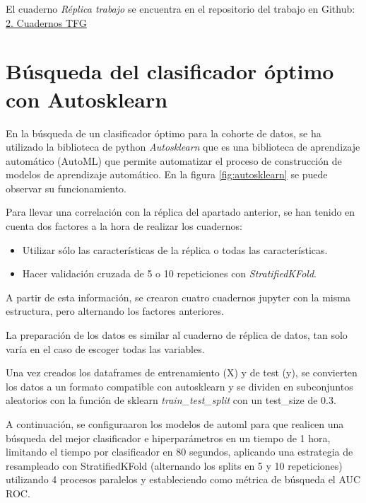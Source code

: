 El cuaderno \textit{Réplica trabajo} se encuentra en el repositorio del trabajo en Github: \href{https://github.com/sgg0008/ml-COVID-19/tree/main/2. Cuadernos TFG}{2. Cuadernos TFG}

\section{Búsqueda del clasificador óptimo con Autosklearn}

En la búsqueda de un clasificador óptimo para la cohorte de datos, se ha utilizado la biblioteca de python \textit{Autosklearn} que es una biblioteca de aprendizaje automático (AutoML) que permite automatizar el proceso de construcción de modelos de aprendizaje automático. En la figura \ref{fig:autosklearn} se puede observar su funcionamiento.


Para llevar una correlación con la réplica del apartado anterior, se han tenido en cuenta dos factores a la hora de realizar los cuadernos:

\begin{itemize}
    \item Utilizar sólo las características de la réplica o todas las características.
    \item Hacer validación cruzada de 5 o 10 repeticiones con \textit{StratifiedKFold}.
\end{itemize}

A partir de esta información, se crearon cuatro cuadernos jupyter con la misma estructura, pero alternando los factores anteriores.

La preparación de los datos es similar al cuaderno de réplica de datos, tan solo varía en el caso de escoger todas las variables.

Una vez creados los dataframes de entrenamiento (X) y de test (y), se convierten los datos a un formato compatible con autosklearn y se dividen en subconjuntos aleatorios con la función de sklearn \textit{train\_test\_split} con un test\_size de 0.3.

A continuación, se configuraaron los modelos de automl para que realicen una búsqueda del mejor clasificador e hiperparámetros en un tiempo de 1 hora, limitando el tiempo por clasificador en 80 segundos, aplicando una estrategia de resampleado con StratifiedKFold (alternando los splits en 5 y 10 repeticiones) utilizando 4 procesos paralelos y estableciendo como métrica de búsqueda el AUC ROC.

